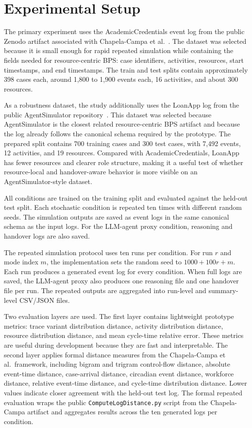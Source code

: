 \section{Experimental Setup}\label{experimental-setup}

The primary experiment uses the AcademicCredentials event log from the
public Zenodo artifact associated with Chapela-Campa et al.~\cite{chapela2025quality}. The
dataset was selected because it is small enough for rapid repeated
simulation while containing the fields needed for resource-centric BPS:
case identifiers, activities, resources, start timestamps, and end
timestamps. The train and test splits contain approximately 398 cases
each, around 1,800 to 1,900 events each, 16 activities, and about 300
resources.

As a robustness dataset, the study additionally uses the LoanApp log
from the public AgentSimulator repository~\cite{kirchdorfer2024agentsimulator}. This
dataset was selected because AgentSimulator is the closest related
resource-centric BPS artifact and because the log already follows the
canonical schema required by the prototype. The prepared split contains
700 training cases and 300 test cases, with 7,492 events, 12
activities, and 19 resources. Compared with AcademicCredentials,
LoanApp has fewer resources and clearer role structure, making it a
useful test of whether resource-local and handover-aware behavior is
more visible on an AgentSimulator-style dataset.

All conditions are trained on the training split and evaluated against
the held-out test split. Each stochastic condition is repeated ten times
with different random seeds. The simulation outputs are saved as event
logs in the same canonical schema as the input logs. For the LLM-agent
proxy condition, reasoning and handover logs are also saved.

The repeated simulation protocol uses ten runs per condition. For run
\(r\) and mode index \(m\), the implementation sets the random seed to
\(1000 + 100r + m\). Each run produces a generated event log for every
condition. When full logs are saved, the LLM-agent proxy also produces
one reasoning file and one handover file per run. The repeated outputs
are aggregated into run-level and summary-level CSV/JSON files.

Two evaluation layers are used. The first layer contains lightweight
prototype metrics: trace variant distribution distance, activity
distribution distance, resource distribution distance, and mean
cycle-time relative error. These metrics are useful during development
because they are fast and interpretable. The second layer applies formal
distance measures from the Chapela-Campa et al.~framework, including
bigram and trigram control-flow distance, absolute event-time distance,
case-arrival distance, circadian event distance, workforce distance,
relative event-time distance, and cycle-time distribution distance.
Lower values indicate closer agreement with the held-out test log. The
formal repeated evaluation wraps the public
\texttt{ComputeLogDistance.py} script from the Chapela-Campa artifact
and aggregates results across the ten generated logs per condition.


